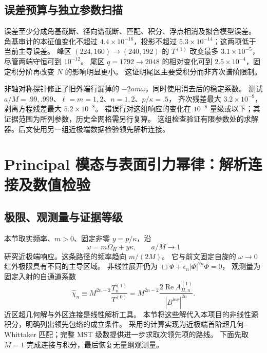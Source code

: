 \documentclass[UTF8,fontset=fandol,11pt,a4paper]{ctexart}
\newcommand{\Rea}{\operatorname{Re}}
\newcommand{\Bin}{B^{\mathrm{inc}}}
\numberwithin{equation}{section}
\begin{document}
\subsection{误差预算与独立参数扫描}
误差至少分成角基截断、径向谱截断、匹配、积分、浮点相消及拟合模型误差。
角基审计的本征值变化不超过 $4.4\times10^{-16}$，投影不超过 $5.3\times10^{-14}$；这两项低于当前主导误差。
峰区 $(224,160)\to(240,192)$ 的 $T^{(1)}$ 改变最多 $3.1\times10^{-5}$，尽管两端守恒可到 $10^{-12}$。
尾区 $q=1792\to2048$ 的相对变化可到 $2.5\times10^{-4}$，固定积分阶再改变 $N$ 的影响明显更小。
这证明尾区主要受积分而非齐次谱阶限制。

非轴对称探针修正了旧外端行漏掉的 $-2am\omega$，同时使用消去后的稳定系数。
测试 $a/M=.99,.999$、$\ell=m=1,2$、$n=1,2$、$p/\kappa=.5$，
齐次残差最大 $3.2\times10^{-9}$，剥离方程残差最大 $5.2\times10^{-8}$。
错误行对这组响应的变化在 $10^{-8}$ 量级或以下；其证据范围为所列参数，历史全网格需另行复算。
这组检查验证有限参数处的求解器。后文使用另一组近极端数据检验领先解析连接。

\section{Principal 模态与表面引力幂律：解析连接及数值检验}
\label{sec:principal-v2}
\subsection{极限、观测量与证据等级}
本节取实频率、$m>0$、固定非零 $y=p/\kappa$，沿
\begin{equation}
\omega=m\Omega_H+y\kappa,\qquad a/M\longrightarrow1
\end{equation}
研究近极端响应。这条路径的频率趋向 $m/(2M)$。
它与前文固定自旋的 $\omega\to0$ 红外极限具有不同的主导区域。
非线性展开仍为 $\Box\Phi+\epsilon_n|\Phi|^{2n}\Phi=0$，
观测量为固定入射的自通道系数
\begin{equation}
\widehat\chi_n\equiv M^{2n-2}\frac{T_n^{(1)}}{T^{(0)}}
=M^{2n-2}\frac{2\Rea A_{H,n}^{(1)}}{|\Bin|^{2n}}.
\label{eq:principal-observable-v2}
\end{equation}
近区超几何解与外区连接是线性解析工具\cite{BredbergKerrCFT2010,MST1996}。
本节将这些解代入本项目的非线性源积分，明确列出领先包络的成立条件。
采用的计算实现为近极端首阶超几何--Whittaker 匹配；完整 MST 级数提供进一步求取次领先项的路线。
下面先取 $M=1$ 完成连接与积分，最后恢复无量纲观测量。
\end{document}
